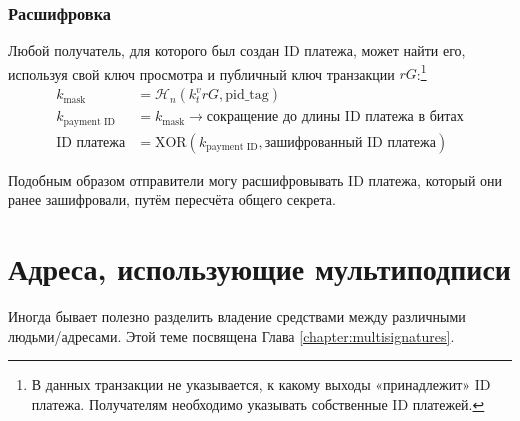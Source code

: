 \subsubsection*{Расшифровка}

Любой получатель, для которого был создан ID платежа, может найти его, используя свой ключ просмотра и публичный ключ транзакции $r G$:\footnote{В данных транзакции не указывается, к какому выходы «принадлежит» ID платежа. Получателям необходимо указывать собственные ID платежей.}\vspace{.175cm}
\begin{align*}
         k_{\textrm{mask}} &= \mathcal{H}_n(k_t^v r G,\textrm{pid\_tag}) \\
      k_{\textrm{payment ID}} &= k_{\textrm{mask}} \rightarrow \textrm{сокращение до длины ID платежа в битах}\\
          \textrm{ID платежа} &= \textrm{XOR}(k_{\textrm{payment ID}}, \textrm{зашифрованный ID платежа})
\end{align*}

Подобным образом отправители могу расшифровывать ID платежа, который они ранее за\-шифровали, путём пересчёта общего секрета.%



\section{Адреса, использующие мультиподписи}
\label{sec:multisignature-addresses}

Иногда бывает полезно разделить владение средствами между различными людьми/адресами. Этой теме посвящена Глава \ref{chapter:multisignatures}.
